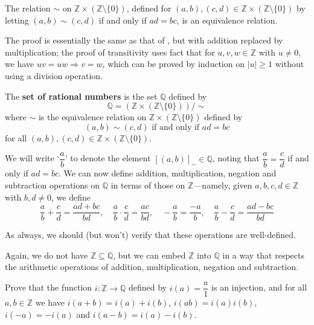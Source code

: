 \begin{lemma}
\label{lemEquivalenceRelationToConstructQFromZ}
The relation $\sim$ on $\mathbb{Z} \times (\mathbb{Z} \setminus \{ 0 \})$, defined for $(a,b), (c,d) \in \mathbb{Z} \times (\mathbb{Z} \setminus \{ 0 \})$ by letting $(a,b) \sim (c,d)$ if and only if $ad=bc$, is an equivalence relation.
\end{lemma}

\begin{csketch}
The proof is essentially the same as that of , but with addition replaced by multiplication; the proof of transitivity uses fact that for $u,v,w \in \mathbb{Z}$ with $u \ne 0$, we have $uv=uw \Rightarrow v=w$, which can be proved by induction on $|u| \ge 1$ without using a division operation.
\end{csketch}

\begin{construction}
\label{cnsRationalsFromIntegers}
The \textbf{set of rational numbers} is the set $\mathbb{Q}$ defined by
\[ \mathbb{Q} = (\mathbb{Z} \times (\mathbb{Z} \setminus \{ 0 \})) / {\sim} \]
where $\sim$ is the equivalence relation on $\mathbb{Z} \times (\mathbb{Z} \setminus \{0\})$ defined by
\[ (a,b) \sim (c,d) \text{ if and only if } ad=bc \]
for all $(a,b),(c,d) \in \mathbb{Z} \times (\mathbb{Z} \setminus \{ 0 \})$.
\end{construction}

We will write `$\dfrac{a}{b}$' to denote the element $[(a,b)]_{\sim} \in \mathbb{Q}$, noting that $\dfrac{a}{b} = \dfrac{c}{d}$ if and only if $ad=bc$. We can now define addition, multiplication, negation and subtraction operations on $\mathbb{Q}$ in terms of those on $\mathbb{Z}$---namely, given $a,b,c,d \in \mathbb{Z}$ with $b,d \ne 0$, we define
\[ \dfrac{a}{b} + \dfrac{c}{d} = \dfrac{ad+bc}{bd}, \quad \dfrac{a}{b} \cdot \dfrac{c}{d} = \dfrac{ac}{bd}, \quad -\dfrac{a}{b} = \dfrac{-a}{b}, \quad \dfrac{a}{b} - \dfrac{c}{d} = \dfrac{ad-bc}{bd} \]

As always, we should (but won't) verify that these operations are well-defined.

Again, we do not have $\mathbb{Z} \subseteq \mathbb{Q}$, but we can embed $\mathbb{Z}$ into $\mathbb{Q}$ in a way that respects the arithmetic operations of addition, multiplication, negation and subtraction.

\begin{exercise}
Prove that the function $i : \mathbb{Z} \to \mathbb{Q}$ defined by $i(a) = \dfrac{a}{1}$ is an injection, and for all $a,b \in \mathbb{Z}$ we have $i(a+b) = i(a)+i(b)$, $i(ab) = i(a)i(b)$, $i(-a) = -i(a)$ and $i(a-b) = i(a)-i(b)$.
\end{exercise}


